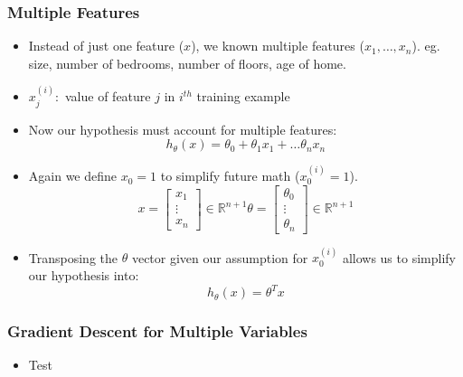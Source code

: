 \subsubsection{Multiple Features}
\begin{itemize}[--]
	\item Instead of just one feature ($x$), we known multiple features ($x_1,\ldots, x_n$). eg. size, number of bedrooms, number of floors, age of home.
	\item $x^{(i)}_j:$ value of feature $j$ in $i^{th}$ training example
	\item Now our hypothesis must account for multiple features: 
		$$h_\theta (x)=\theta_0 + \theta_1 x_1 + \ldots \theta_n x_n$$
	\item Again we define $x_0 = 1$ to simplify future math ($x^{(i)}_0=1$).
	$$x=\begin{bmatrix} x_1\\ \vdots\\ x_n\end{bmatrix}\in \mathbb{R}^{n+1}
		\theta = \begin{bmatrix}\theta_0 \\ \vdots\\ \theta_n\end{bmatrix}\in\mathbb{R}^{n+1}$$
	\item Transposing the $\theta$ vector given our assumption for $x_0^{(i)}$ allows us to simplify our hypothesis into:
		$$h_\theta (x) = \theta^{T}x$$
\end{itemize}

\subsubsection{Gradient Descent for Multiple Variables}
\begin{itemize}[--]
	\item Test
\end{itemize}